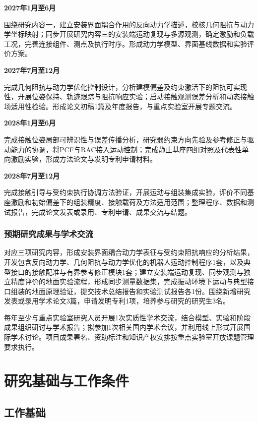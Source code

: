 \documentclass[UTF8,a4paper,zihao=-4,fontset=fandol]{ctexart}
\newcommand{\topic}[1]{\par\Needspace{4\baselineskip}\addvspace{0.5em}\noindent\textbf{#1}\par\nobreak}
\newcommand{\rev}[1]{{\color{red}#1}}
\begin{document}
\topic{2027年1月至6月}
围绕研究内容一\rev{，建立安装界面耦合作用的反向动力学描述，校核几何阻抗与动力学坐标映射；同步}开展研究内容三的\rev{安装端运动复现与多源观测，}确定激励\rev{和}负载工况，完善连接\rev{组件、测点}及执行时序。\rev{形成}动力学模型、\rev{界面基线}数据\rev{和实验评价}方案。

\topic{2027年7月至12月}
完成几何阻抗与动力学优化控制设计\rev{，分析建模偏差}及\rev{约束激活下的阻抗可实现性}，开展位姿保持、轨迹跟踪与阻抗响应\rev{实验}；启动接触观测\rev{误差分析和动态}接触场适用性\rev{检验}。形成论文初稿1篇\rev{及}年度报告，与重点实验室开展专题交流。

\topic{2028年1月至6月}
\rev{完成接触位姿局部可辨识性与误差传播分析，}研究\rev{弱约束方向先验及参考修正与驱动能力的协调}，\rev{将}PCF与RAC接入运动控制\rev{；}完成\rev{静止}基座四组对照\rev{及代表性}单向激励\rev{实验}，形成方法论文\rev{与}发明专利申请材料。

\topic{2028年7月至12月}
完成\rev{接触引导与受约束执行协调方法}验证，\rev{开展运动}与\rev{组装}集成\rev{实验，评价不同}基座\rev{激励和初始偏差}下的\rev{组装精度、接触载荷}及方法适用范围；整理程序、数据\rev{和}测试报告，完成论文发表或录用、专利申请\rev{、}成果交流\rev{与结题}。

\subsubsection{预期研究成果与学术交流}

对应三项研究内容，形成\rev{安装界面耦合动力学表征与受约束阻抗响应的分析结果，开发}包含\rev{反向}动力学、几何阻抗与动力学优化的机器人运动控制程序1套\rev{，以及}典型接口的接触配准与\rev{有界}参考修正模块1套\rev{；}建立\rev{安装端运动复现、同步观测与独立精度评价的}地面实验流程，形成同步测量数据集\rev{，}完成振动\rev{环境}下运动与典型接口组装\rev{的}地面原理验证，提交技术总结报告和\rev{实验}测试报告各1份。围绕新增研究发表或录用学术论文3篇\rev{，申请发明专利1项}，培养参与研究的研究生3名。

每年至少与重点实验室研究人员开展1次实质性学术交流，结合模型、实验和阶段成果组织研讨与学术报告；拟参加1次相关国内学术会议，并利用线上形式开展国际学术讨论。项目成果署名、资助标注和知识产权安排按重点实验室开放课题管理要求执行。

\section{研究基础与工作条件}

\subsection{工作基础}
\end{document}
